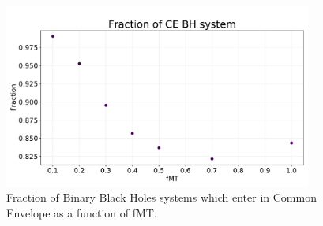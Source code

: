 \documentclass[prb,twocolumn,9pt]{revtex4-1}
\begin{document}
\begin{figure}[hp]
    \begin{minipage}[l]{1.0\columnwidth}
    \centering
    \includegraphics[width=0.9\textwidth]{images/assignment2/frac_CE.pdf}
    \caption{Fraction of Binary Black Holes systems which enter in Common Envelope as a function of fMT.}
    \label{fig:ass2_frac_CE}
    \end{minipage}
\end{figure}
\end{document}
